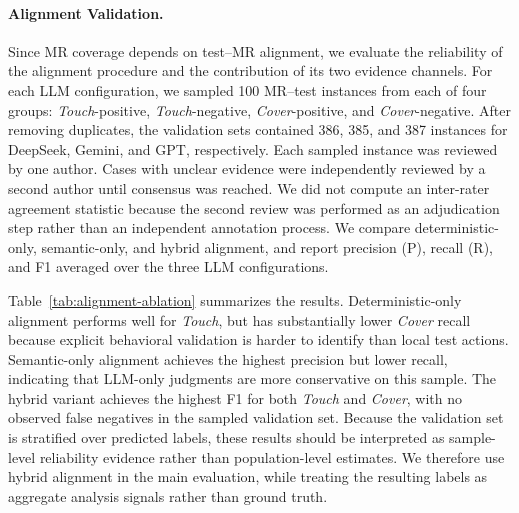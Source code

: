 

\paragraph{Alignment Validation.}
Since MR coverage depends on test--MR alignment, we evaluate the reliability of the alignment procedure and the contribution of its two evidence channels. For each LLM configuration, we sampled 100 MR--test instances from each of four groups: \textit{Touch}-positive, \textit{Touch}-negative, \textit{Cover}-positive, and \textit{Cover}-negative. After removing duplicates, the validation sets contained 386, 385, and 387 instances for DeepSeek, Gemini, and GPT, respectively. Each sampled instance was reviewed by one author. Cases with unclear evidence were independently reviewed by a second author until consensus was reached. We did not compute an inter-rater agreement statistic because the second review was performed as an adjudication step rather than an independent annotation process. We compare deterministic-only, semantic-only, and hybrid alignment, and report precision (P), recall (R), and F1 averaged over the three LLM configurations.

Table~\ref{tab:alignment-ablation} summarizes the results. Deterministic-only alignment performs well for \textit{Touch}, but has substantially lower \textit{Cover} recall because explicit behavioral validation is harder to identify than local test actions. Semantic-only alignment achieves the highest precision but lower recall, indicating that LLM-only judgments are more conservative on this sample. The hybrid variant achieves the highest F1 for both \textit{Touch} and \textit{Cover}, with no observed false negatives in the sampled validation set. Because the validation set is stratified over predicted labels, these results should be interpreted as sample-level reliability evidence rather than population-level estimates. We therefore use hybrid alignment in the main evaluation, while treating the resulting labels as aggregate analysis signals rather than ground truth.


